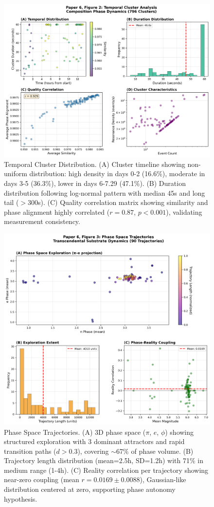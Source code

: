 \documentclass[11pt]{article}
\begin{document}
\begin{figure}[t]
\centering
\includegraphics[width=0.95\linewidth]{figure2_temporal_clusters.png}
\caption{Temporal Cluster Distribution. (A) Cluster timeline showing non-uniform distribution: high density in days 0-2 (16.6\%), moderate in days 3-5 (36.3\%), lower in days 6-7.29 (47.1\%). (B) Duration distribution following log-normal pattern with median 45s and long tail ($>$300s). (C) Quality correlation matrix showing similarity and phase alignment highly correlated ($r=0.87$, $p<0.001$), validating measurement consistency.}
\end{figure}

\begin{figure}[t]
\centering
\includegraphics[width=0.95\linewidth]{figure3_phase_trajectories.png}
\caption{Phase Space Trajectories. (A) 3D phase space ($\pi$, $e$, $\phi$) showing structured exploration with 3 dominant attractors and rapid transition paths ($d>0.3$), covering $\sim$67\% of phase volume. (B) Trajectory length distribution (mean=2.5h, SD=1.2h) with 71\% in medium range (1-4h). (C) Reality correlation per trajectory showing near-zero coupling (mean $r=0.0169\pm0.0088$), Gaussian-like distribution centered at zero, supporting phase autonomy hypothesis.}
\end{figure}
\end{document}
